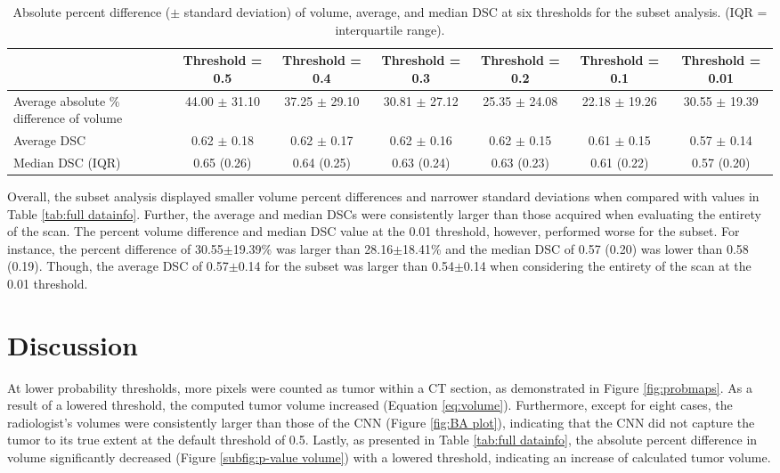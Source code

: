 \documentclass{article}
\begin{document}
\begin{table}[H]
\centering
\caption{Absolute percent difference ($\pm$ standard deviation) of volume, average, and median DSC at six thresholds for the subset analysis. (IQR = interquartile range).}
\label{tab:subset datainfo}
\begin{adjustbox}{width=1\textwidth}
{\renewcommand{\arraystretch}{2}
\begin{tabular}{l c c c c c c}
\toprule
     & \multicolumn{1}{c}{Threshold = 0.5} & \multicolumn{1}{c}{Threshold = 0.4} & \multicolumn{1}{c}{Threshold = 0.3} & \multicolumn{1}{c}{Threshold = 0.2}  & \multicolumn{1}{c}{Threshold = 0.1} & \multicolumn{1}{c}{Threshold = 0.01} \\ \midrule
Average absolute \% difference of volume & 44.00 $\pm$ 31.10 & 37.25 $\pm$ 29.10 & 30.81 $\pm$ 27.12 & 25.35 $\pm$ 24.08 & 22.18 $\pm$ 19.26 & 30.55 $\pm$ 19.39 \\
Average DSC & 0.62 $\pm$ 0.18 & 0.62 $\pm$ 0.17 & 0.62 $\pm$ 0.16 & 0.62 $\pm$ 0.15 & 0.61 $\pm$ 0.15 & 0.57 $\pm$ 0.14 \\
Median DSC (IQR) & 0.65 (0.26) & 0.64 (0.25) & 0.63 (0.24) & 0.63 (0.23) & 0.61 (0.22) & 0.57 (0.20) \\ \bottomrule
\end{tabular}}
\end{adjustbox}
\end{table}

Overall, the subset analysis displayed smaller volume percent differences and narrower standard deviations when compared with values in Table \ref{tab:full datainfo}. Further, the average and median DSCs were consistently larger than those acquired when evaluating the entirety of the scan. The percent volume difference and median DSC value at the 0.01 threshold, however, performed worse for the subset. For instance, the percent difference of 30.55$\pm$19.39\% was larger than 28.16$\pm$18.41\% and the median DSC of 0.57 (0.20) was lower than 0.58 (0.19). Though, the average DSC of 0.57$\pm$0.14 for the subset was larger than 0.54$\pm$0.14 when considering the entirety of the scan at the 0.01 threshold.

\section{Discussion}
At lower probability thresholds, more pixels were counted as tumor within a CT section, as demonstrated in Figure \ref{fig:probmaps}. As a result of a lowered threshold, the computed tumor volume increased (Equation \ref{eq:volume}). Furthermore, except for eight cases, the radiologist’s volumes were consistently larger than those of the CNN (Figure \ref{fig:BA plot}), indicating that the CNN did not capture the tumor to its true extent at the default threshold of 0.5. Lastly, as presented in Table \ref{tab:full datainfo}, the absolute percent difference in volume significantly decreased (Figure \ref{subfig:p-value volume}) with a lowered threshold, indicating an increase of calculated tumor volume.
\end{document}
